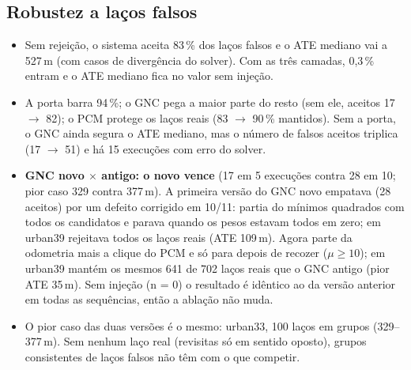\documentclass[11pt,a4paper]{article}
\begin{document}
\subsection{Robustez a laços falsos}
\begin{table}[H]\centering\small
\caption{Laços falsos nas 10 sequências (120 execuções por configuração, 6360 laços falsos injetados).}
\label{tab:falsos}
\end{table}
\begin{itemize}
  \item Sem rejeição, o sistema aceita 83\,\% dos laços falsos e o ATE mediano vai a 527\,m (com casos de divergência
        do solver). Com as três camadas, 0,3\,\% entram e o ATE mediano fica no valor sem injeção.
  \item A porta barra 94\,\%; o GNC pega a maior parte do resto (sem ele, aceitos 17 $\to$ 82); o PCM protege os laços
        reais (83 $\to$ 90\,\% mantidos). Sem a porta, o GNC ainda segura o ATE mediano, mas o número de falsos aceitos
        triplica (17 $\to$ 51) e há 15 execuções com erro do solver.
  \item \textbf{GNC novo $\times$ antigo: o novo vence} (17 em 5 execuções contra 28 em 10; pior caso 329 contra 377\,m).
        A primeira versão do GNC novo empatava (28 aceitos) por um defeito corrigido em 10/11: partia do mínimos
        quadrados com todos os candidatos e parava quando os pesos estavam todos em zero; em urban39 rejeitava todos os
        laços reais (ATE 109\,m). Agora parte da odometria mais a clique do PCM e só para depois de recozer
        ($\mu\geq10$); em urban39 mantém os mesmos 641 de 702 laços reais que o GNC antigo (pior ATE 35\,m). Sem
        injeção (n = 0) o resultado é idêntico ao da versão anterior em todas as sequências, então a ablação não muda.
  \item O pior caso das duas versões é o mesmo: urban33, 100 laços em grupos (329--377\,m). Sem nenhum laço real
        (revisitas só em sentido oposto), grupos consistentes de laços falsos não têm com o que competir.
\end{itemize}
\end{document}
